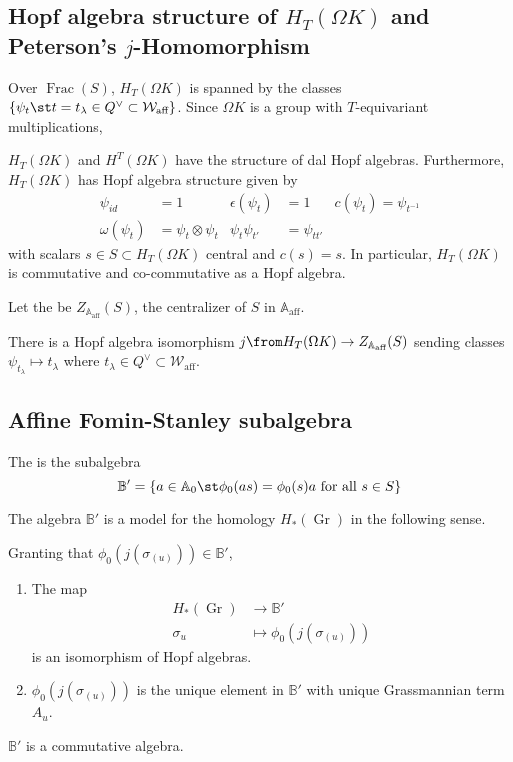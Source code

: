 \documentclass[11pt,leqno,oneside]{amsart}
\numberwithin{thm}{section}
\renewcommand{\W}{\mathcal{W}}
\newcommand{\Waff}{\W_{\text{aff}}}
\newcommand{\A}{\mathbb{A}}
\newcommand{\Aaff}{\A_{\text{aff}}}
\newcommand{\B}{\mathbb{B}}
\newcommand{\Gr}{\operatorname{Gr}}
\DeclareMathOperator{\Frac}{Frac}
\begin{document}
\subsection{Hopf algebra structure of \(H_T(\Omega K)\) and Peterson's \(j\)-Homomorphism}
Over \(\Frac(S)\), \(H_T(\Omega K)\) is spanned by the classes
\(\{\psi_t \st t = t_\lambda \in Q^\vee \subset \Waff\}\). Since
\(\Omega K\) is a group with \(T\)-equivariant multiplications,
\begin{prop}
  \(H_T(\Omega K)\) and \(H^T(\Omega K)\) have the structure of dal
  Hopf algebras. Furthermore, \(H_T(\Omega K)\) has Hopf algebra
  structure given by
  \begin{align*}
    \psi_{id} & = 1& \epsilon(\psi_t) & = 1& c(\psi_t) = \psi_{t^{-1}} \\
    \omega(\psi_t) & = \psi_t \otimes \psi_t & \psi_t \psi_{t'} &=
                                             \psi_{tt'}
  \end{align*}
  with scalars \(s \in S \subset H_T(\Omega K)\) central and \(c(s) =
  s\). In particular, \(H_T(\Omega K)\) is commutative and
  co-commutative as a Hopf algebra.
\end{prop}
\begin{defn}
  Let the  be \(Z_{\Aaff}(S)\), the
  centralizer of \(S\) in \(\Aaff\).
\end{defn}
\begin{prop}
  There is a Hopf algebra isomorphism \(j \from H_T(\Omega K) \to
  Z_{\Aaff}(S)\) sending classes \(\psi_{t_\lambda} \mapsto
  t_\lambda\) where \(t_\lambda \in Q^\vee \subset \Waff\).
\end{prop}
\subsection{Affine Fomin-Stanley subalgebra}
\begin{defn}
  The  is the subalgebra \[
    \B' = \{a \in \A_0 \st \phi_0(as) = \phi_0(s)a \text{ for all }s
    \in S\}
  \]
\end{defn}
The algebra \(\B'\) is a model for the homology \(H_*(\Gr)\) in the
following sense.
\begin{prop}\label{affine-fomin-stanley-isom-to-homology}
  Granting that \(\phi_0(j(\sigma_{(u)})) \in \B'\),
  \begin{enumerate}
  \item The map
    \begin{align*}
      H_*(\Gr) & \to \B' \\
      \sigma_u & \mapsto \phi_0(j(\sigma_{(u)}))
    \end{align*}
    is an isomorphism of Hopf algebras.
  \item \(\phi_0(j(\sigma_{(u)}))\) is the unique element in \(\B'\)
    with unique Grassmannian term \(A_u\).
  \end{enumerate}
\end{prop}
\begin{cor}
  \(\B'\) is a commutative algebra.
\end{cor}
\end{document}
